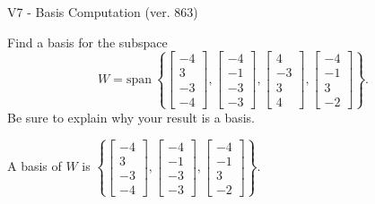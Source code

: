 \begin{exercise}
  \begin{exerciseTitle}V7 - Basis Computation (ver. 863)\end{exerciseTitle}
  \begin{exerciseStatement}
    Find a basis for the subspace 
\[W=\mathrm{span}\ \left\{\left[\begin{array}{r}
-4 \\
3 \\
-3 \\
-4
\end{array}\right] , \left[\begin{array}{r}
-4 \\
-1 \\
-3 \\
-3
\end{array}\right] , \left[\begin{array}{r}
4 \\
-3 \\
3 \\
4
\end{array}\right] , \left[\begin{array}{r}
-4 \\
-1 \\
3 \\
-2
\end{array}\right]\right\}.\]
 Be sure to explain why your result is a basis.


  \end{exerciseStatement}
  \begin{exerciseAnswer}
   A basis of \(W\) is  \(\left\{\left[\begin{array}{r}
-4 \\
3 \\
-3 \\
-4
\end{array}\right] , \left[\begin{array}{r}
-4 \\
-1 \\
-3 \\
-3
\end{array}\right] , \left[\begin{array}{r}
-4 \\
-1 \\
3 \\
-2
\end{array}\right]\right\}\).
  


  \end{exerciseAnswer}
\end{exercise}